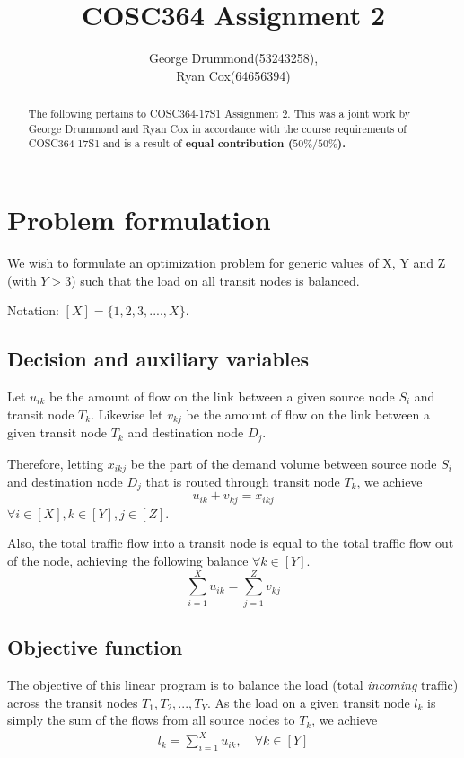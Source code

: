 \documentclass[12pt,twoside]{article}
\begin{document}
\title{COSC364 Assignment 2}
\author{George Drummond(53243258), \\Ryan Cox(64656394)}
\maketitle
\thispagestyle{empty}

\begin{abstract}
The following pertains to COSC364-17S1  Assignment 2.
This was a joint work by George Drummond and Ryan Cox in accordance with the course requirements of COSC364-17S1 and is a result of \bf{equal} contribution ($50\% / 50\%$).
\end{abstract}

\tableofcontents

\newpage
\section{Problem formulation}
We wish to formulate an optimization problem for generic values of X, Y and Z (with $ Y> 3$) such that the load on all transit nodes is balanced.

Notation: $[X] = \{1,2,3,....,X\}$.

\subsection{Decision and auxiliary variables}
Let $u_{ik}$ be the amount of flow on the link between a given source node $S_i$ and transit node $T_k$.
Likewise let $v_{kj}$ be the amount of flow on the link between a given transit node $T_k$ and destination node $D_j$.

Therefore, letting $x_{ikj}$ be the part of the demand volume between source node $S_i$ and destination node $D_j$ that is routed through transit node $T_k$, we achieve 
\begin{equation}\label{first}
	u_{ik} + v_{kj} = x_{ikj} 
\end{equation}
$\forall i \in [X], k \in [Y], j \in [Z]$.

Also, the total traffic flow into a transit node is equal to the total traffic flow out of the node, achieving the following balance $\forall k \in [Y]$.
\begin{equation}
	\sum_{i=1}^{X}u_{ik} = \sum_{j=1}^{Z}v_{kj}
\end{equation}




\subsection{Objective function}\label{Sec: objf}
The objective of this linear program is to balance the load (total \emph{incoming} traffic) across the transit nodes $T_1,T_2,...,T_Y$. As the load on a given transit node $l_k$ is simply the sum of the flows from all source nodes to $T_k$, we achieve
\begin{align*}
	l_k  = \sum_{i=1}^{X}u_{ik},   \quad  \forall k \in [Y]
\end{align*}
\end{document}
